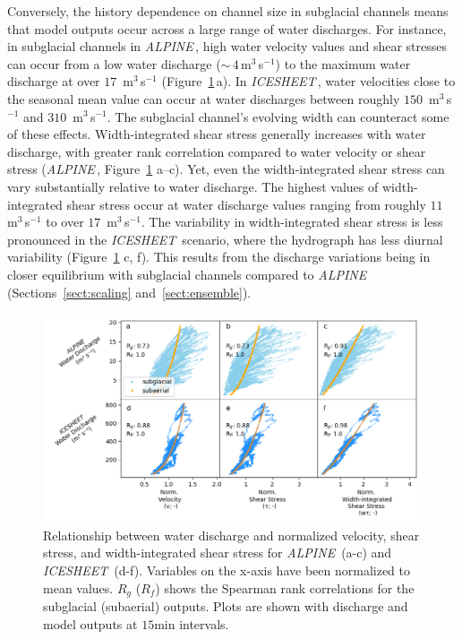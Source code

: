 \documentclass[esurf, manuscript]{copernicus}
\newcommand{\alpine}{\textit{ALPINE}\,}
\newcommand{\icesheet}{\textit{ICESHEET}\,}
\begin{document}
Conversely, the history dependence on channel size in subglacial channels means that model outputs occur across a large range of water discharges.
For instance, in subglacial channels in \alpine{},  high water velocity values and shear stresses can occur from a low water discharge  ($\sim\,4$\,\unit{m}$^3$\,\unit{s}$^{-1}$) to the maximum water discharge at over $17$ \,\unit{m}$^3$\,\unit{s}$^{-1}$ (Figure~\ref{fig:Qw_vari}\,a).
In \icesheet{}, water velocities close to the seasonal mean value can occur at water discharges between roughly $150$ \,\unit{m}$^3$\,\unit{s}$^{-1}$ and $310$ \,\unit{m}$^3$\,\unit{s}$^{-1}$.
The subglacial channel's evolving width can counteract some of these effects.
Width-integrated shear stress generally increases with water discharge, with greater rank correlation compared to water velocity or shear stress (\alpine{}, Figure~\ref{fig:Qw_vari} a--c).
Yet, even the width-integrated shear stress can vary substantially relative to water discharge.
The highest values of width-integrated shear stress occur at water discharge values ranging from roughly $11$ \,\unit{m}$^3$\,\unit{s}$^{-1}$ to over $17$ \,\unit{m}$^3$\,\unit{s}$^{-1}$.
The variability in width-integrated shear stress is less pronounced in the \icesheet{} scenario, where the hydrograph has less diurnal variability (Figure~\ref{fig:Qw_vari} c, f).
This results from the discharge variations being in closer equilibrium with subglacial channels compared to \alpine{} (Sections~\ref{sect:scaling} and~\ref{sect:ensemble}).

\begin{figure}[hbt!]
  \centering
  \includegraphics[width=0.9\linewidth]{Fig6.png}
  \caption{
    Relationship between water discharge and normalized velocity, shear stress, and width-integrated shear stress for \alpine{} (a-c) and \icesheet{} (d-f).
    Variables on the x-axis have been normalized to mean values.
    $R_g$ ($R_f$) shows the Spearman rank correlations for the subglacial (subaerial) outputs.
    Plots are shown with discharge and model outputs at $15$\unit{min} intervals.
  }
  \label{fig:Qw_vari}
\end{figure}
\end{document}
